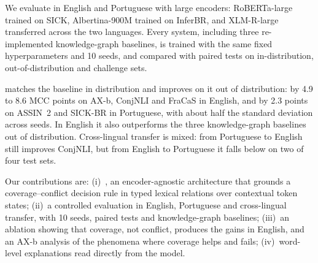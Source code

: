We evaluate \model{} in English and Portuguese with large encoders: RoBERTa-large trained on SICK,
Albertina-900M trained on InferBR, and XLM-R-large transferred across the two languages. Every system,
including three re-implemented knowledge-graph baselines, is trained with the same fixed hyperparameters
and 10 seeds, and compared with paired tests on in-distribution, out-of-distribution and challenge sets.

\model{} matches the \cls{} baseline in distribution and improves on it out of distribution: by 4.9 to
8.6 MCC points on AX-b, ConjNLI and FraCaS in English, and by 2.3 points on ASSIN~2 and SICK-BR in
Portuguese, with about half the standard deviation across seeds. In English it also outperforms the
three knowledge-graph baselines out of distribution. Cross-lingual transfer is mixed: from Portuguese to
English \model{} still improves ConjNLI, but from English to Portuguese it falls below \cls{} on two of four
test sets.

Our contributions are:
(i)~\model{}, an encoder-agnostic architecture that grounds a coverage--conflict decision rule in typed
lexical relations over contextual token states;
(ii)~a controlled evaluation in English, Portuguese and cross-lingual transfer, with 10 seeds, paired
tests and knowledge-graph baselines;
(iii)~an ablation showing that coverage, not conflict, produces the gains in English, and an AX-b analysis of the
phenomena where coverage helps and fails;
(iv)~word-level explanations read directly from the model.
